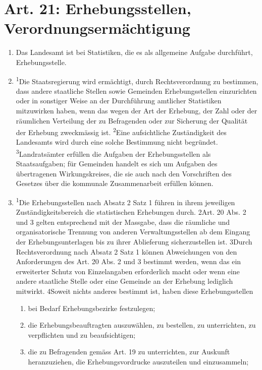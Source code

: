 \documentclass[A4, 12pt]{scrbook}
\begin{document}
    \section{Art. 21: Erhebungsstellen, Verordnungsermächtigung}
        \begin{enumerate}[label=(\arabic*)]
            \item Das Landesamt ist bei Statistiken, die es als allgemeine Aufgabe durchführt, Erhebungsstelle.
            \item \textsuperscript{1}Die Staatsregierung wird ermächtigt, durch Rechtsverordnung zu bestimmen, dass andere staatliche Stellen sowie Gemeinden Erhebungsstellen einzurichten oder in sonstiger Weise an der Durchführung amtlicher Statistiken mitzuwirken haben, wenn das wegen der Art der Erhebung, der Zahl oder der räumlichen Verteilung der zu Befragenden oder zur Sicherung der Qualität der Erhebung zweckmässig ist. \textsuperscript{2}Eine aufsichtliche Zuständigkeit des Landesamts wird durch eine solche Bestimmung nicht begründet. \textsuperscript{3}Landratsämter erfüllen die Aufgaben der Erhebungsstellen als Staatsaufgaben; für Gemeinden handelt es sich um Aufgaben des übertragenen Wirkungskreises, die sie auch nach den Vorschriften des Gesetzes über die kommunale Zusammenarbeit erfüllen können.
            \item \textsuperscript{1}Die Erhebungsstellen nach Absatz 2 Satz 1 führen in ihrem jeweiligen Zu\-stän\-dig\-keits\-be\-reich die statistischen Erhebungen durch. 2Art. 20 Abs. 2 und 3 gelten entsprechend mit der Massgabe, dass die räumliche und organisatorische Trennung von anderen Verwaltungsstellen ab dem Eingang der Erhebungsunterlagen bis zu ihrer Ablieferung sicherzustellen ist. 3Durch Rechtsverordnung nach Absatz 2 Satz 1 können Abweichungen von den Anforderungen des Art. 20 Abs. 2 und 3 bestimmt werden, wenn das ein erweiterter Schutz von Einzelangaben erforderlich macht oder wenn eine andere staatliche Stelle oder eine Gemeinde an der Erhebung lediglich mitwirkt. 4Soweit nichts anderes bestimmt ist, haben diese Erhebungsstellen
                \begin{enumerate}[label=\arabic*.]
                    \item bei Bedarf Erhebungsbezirke festzulegen;
                    \item die Erhebungsbeauftragten auszuwählen, zu bestellen, zu unterrichten, zu verpflichten und zu beaufsichtigen;
                    \item die zu Befragenden gemäss Art. 19 zu unterrichten, zur Auskunft heranzuziehen, die Erhebungsvordrucke auszuteilen und einzusammeln;

\end{enumerate}
\end{enumerate}
\end{document}

